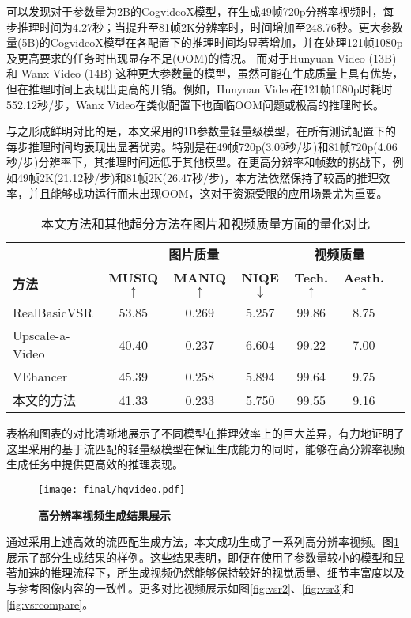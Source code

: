 可以发现对于参数量为2B的CogvideoX模型，在生成49帧720p分辨率视频时，每步推理时间为4.27秒；当提升至81帧2K分辨率时，时间增加至248.76秒。更大参数量(5B)的CogvideoX模型在各配置下的推理时间均显著增加，并在处理121帧1080p及更高要求的任务时出现显存不足(OOM)的情况。
而对于Hunyuan Video (13B) 和 Wanx Video (14B) 这种更大参数量的模型，虽然可能在生成质量上具有优势，但在推理时间上表现出更高的开销。例如，Hunyuan Video在121帧1080p时耗时552.12秒/步，Wanx Video在类似配置下也面临OOM问题或极高的推理时长。

与之形成鲜明对比的是，本文采用的1B参数量轻量级模型，在所有测试配置下的每步推理时间均表现出显著优势。特别是在49帧720p(3.09秒/步)和81帧720p(4.06秒/步)分辨率下，其推理时间远低于其他模型。在更高分辨率和帧数的挑战下，例如49帧2K(21.12秒/步)和81帧2K(26.47秒/步)，本方法依然保持了较高的推理效率，并且能够成功运行而未出现OOM，这对于资源受限的应用场景尤为重要。
\begin{table}[!t]
\centering
\caption{本文方法和其他超分方法在图片和视频质量方面的量化对比}
\small
\begin{tabular}{lcccccc}
\toprule
& \multicolumn{3}{c}{\textbf{图片质量}} & \multicolumn{2}{c}{\textbf{视频质量 \cite{dover}}} \\
\cmidrule(lr){2-4} \cmidrule(lr){5-6} 
\textbf{方法} & \textbf{MUSIQ\cite{ke2021musiq}$\uparrow$} & 
\textbf{MANIQ\cite{maniqa}$\uparrow$} &
\textbf{NIQE\cite{niqe}$\downarrow$} &  
\textbf{Tech.$\uparrow$} & \textbf{Aesth.$\uparrow$} \\
\midrule
RealBasicVSR\cite{RealBasicVSR} &53.85 &0.269&5.257 &99.86& 8.75 \\
Upscale-a-Video\cite{zhou2024upscaleavideo}&40.40 &0.237 &6.604 & 99.22& 7.00\\
VEhancer\cite{he2024venhancer}&45.39 &0.258 &5.894&99.64&9.75\\
\bottomrule
本文的方法&41.33 &0.233 & 5.750&99.55&9.16 \\
\end{tabular}
\label{tab:vsr_compare}
\end{table}
表格和图表的对比清晰地展示了不同模型在推理效率上的巨大差异，有力地证明了这里采用的基于流匹配的轻量级模型在保证生成能力的同时，能够在高分辨率视频生成任务中提供更高效的推理表现。
\begin{figure}[h]
    \centering
    \texttt{[image: final/hqvideo.pdf]}
    \caption{\textbf{高分辨率视频生成结果展示}}
    \label{hqvideo}
\end{figure}
通过采用上述高效的流匹配生成方法，本文成功生成了一系列高分辨率视频。图\ref{hqvideo}展示了部分生成结果的样例。这些结果表明，即便在使用了参数量较小的模型和显著加速的推理流程下，所生成视频仍然能够保持较好的视觉质量、细节丰富度以及与参考图像内容的一致性。更多对比视频展示如图\ref{fig:vsr2}、\ref{fig:vsr3}和\ref{fig:vsrcompare}。

